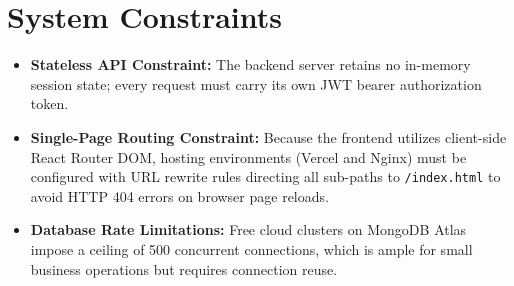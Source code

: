 \section{System Constraints}
\begin{itemize}
    \item \textbf{Stateless API Constraint:} The backend server retains no in-memory session state; every request must carry its own JWT bearer authorization token.
    \item \textbf{Single-Page Routing Constraint:} Because the frontend utilizes client-side React Router DOM, hosting environments (Vercel and Nginx) must be configured with URL rewrite rules directing all sub-paths to \texttt{/index.html} to avoid HTTP 404 errors on browser page reloads.
    \item \textbf{Database Rate Limitations:} Free cloud clusters on MongoDB Atlas impose a ceiling of 500 concurrent connections, which is ample for small business operations but requires connection reuse.
\end{itemize}

